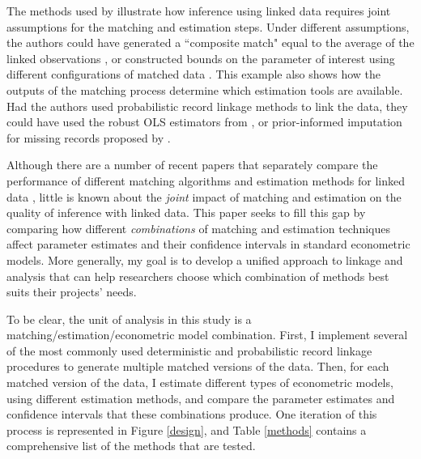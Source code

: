 \documentclass[12pt]{article}
\begin{document}
The methods used by \cite{aizer2016} illustrate how inference using linked data requires joint assumptions for the matching and estimation steps.  Under different assumptions, the authors could have generated a ``composite match" equal to the average of the linked observations \citep{bleakley2016}, or constructed bounds on the parameter of interest using different configurations of matched data \citep{nq2015}.   This example also shows how the outputs of the matching process determine which estimation tools are available.  Had the authors used probabilistic record linkage methods to link the data, they could have used the robust OLS estimators from \cite{lahiri05}, or prior-informed imputation for missing records proposed by \cite{Goldstein2012}.   

Although there are a number of recent papers that separately compare the performance of different matching algorithms  \citep{bailey2017, arp2018} and estimation methods for linked data \citep{harron2014}, little is known about the \textit{joint} impact of matching and estimation on the quality of inference with linked data.  This paper seeks to fill this gap by comparing how different \textit{combinations} of matching and estimation techniques affect parameter estimates and their confidence intervals in standard econometric models.   More generally, my goal is to develop a unified approach to linkage and analysis that can help researchers choose which combination of methods best suits their projects' needs. 

To be clear, the unit of analysis in this study is a matching/estimation/econometric model combination.   First, I implement several of the most commonly used deterministic and probabilistic record linkage procedures to generate multiple matched versions of the data.  Then, for each matched version of the data, I estimate different types of econometric models, using different estimation methods, and compare the parameter estimates and confidence intervals that these combinations produce.  One iteration of this process is represented in Figure \ref{design}, and Table \ref{methods} contains a comprehensive list of the methods that  are tested. 
\end{document}
